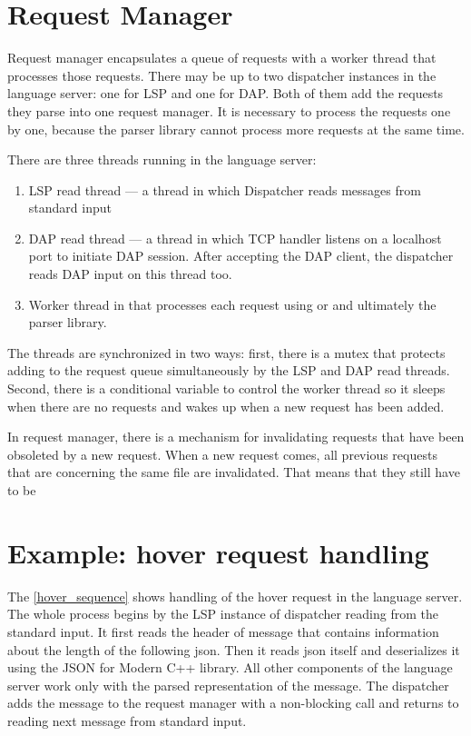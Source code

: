 \section{Request Manager}

Request manager encapsulates a queue of requests with a worker thread that processes those requests. There may be up to two dispatcher instances in the language server: one for LSP and one for DAP. Both of them add the requests they parse into one request manager. It is necessary to process the requests one by one, because the parser library cannot process more requests at the same time.

There are three threads running in the language server:
\begin{enumerate}
	\item LSP read thread --- a thread in which Dispatcher reads messages from standard input
	\item DAP read thread --- a thread in which TCP handler listens on a localhost port to initiate DAP session. After accepting the DAP client, the dispatcher reads DAP input on this thread too.
	\item Worker thread in that processes each request using  or  and ultimately the parser library.
\end{enumerate}

The threads are synchronized in two ways: first, there is a mutex that protects adding to the request queue simultaneously by the LSP and DAP read threads. Second, there is a conditional variable to control the worker thread so it sleeps when there are no requests and wakes up when a new request has been added.

In request manager, there is a mechanism for invalidating requests that have been obsoleted by a new request. When a new request comes, all previous requests that are concerning the same file are invalidated. That means that they still have to be 

\section{Example: hover request handling}

The \cref{hover_sequence} shows handling of the hover request in the language server. The whole process begins by the LSP instance of dispatcher reading from the standard input. It first reads the header of message that contains information about the length of the following json. Then it reads json itself and deserializes it using the JSON for Modern C++ library. All other components of the language server work only with the parsed representation of the message. The dispatcher adds the message to the request manager with a non-blocking call and returns to reading next message from standard input.

